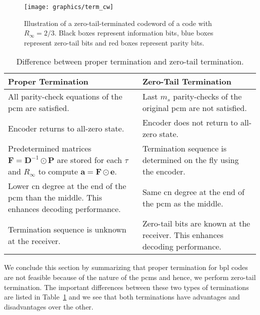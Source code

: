 \begin{figure}[htbp]
  \centering
  \texttt{[image: graphics/term\_cw]}
  \caption{Illustration of a zero-tail-terminated codeword of a code with $R_\infty=2/3$. Black boxes represent information bits, blue boxes represent zero-tail bits and red boxes represent parity bits.}
  \label{fig:term_cw}
\end{figure}

\begin{table}[htbp]
  \centering
  \begin{tabular}{|p{7cm}|p{7cm}|}
    \hline
    \textbf{Proper Termination} &\textbf{Zero-Tail Termination}\\
    \hline
    \hline
    All parity-check equations of the \gls{pcm} are satisfied. &Last $m_s$ parity-checks of the original \gls{pcm} are not satisfied.\\
    \hline
    Encoder returns to all-zero state. &Encoder does not return to all-zero state.\\
    \hline
    Predetermined matrices $\mathbf{F}=\mathbf{D}^{-1}\odot\mathbf{P}$ are stored for each $\tau$ and $R_\infty$ to compute $\mathbf{a}=\mathbf{F}\odot\mathbf{e}$. &Termination sequence is determined on the fly using the encoder.\\
    \hline
    Lower \gls{cn} degree at the end of the \gls{pcm} than the middle. This enhances decoding performance. &Same \gls{cn} degree at the end of the \gls{pcm} as the middle.\\
    \hline
    Termination sequence is unknown at the receiver. &Zero-tail bits are known at the receiver. This enhances decoding performance.\\
    \hline
  \end{tabular}
  \caption{Difference between proper termination and zero-tail termination.}
  \label{tab:diff_term}
\end{table}

We conclude this section by summarizing that proper termination for \gls{bpl} codes are not feasible because of the nature of the \glspl{pcm} and hence, we perform zero-tail termination. The important differences between these two types of terminations are listed in Table~\ref{tab:diff_term} and we see that both terminations have advantages and disadvantages over the other.